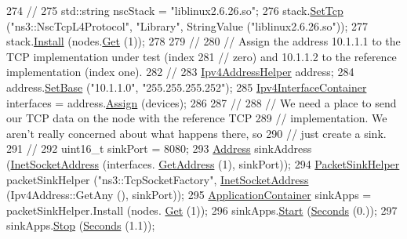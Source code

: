 \begin{DoxyCode}
274   \textcolor{comment}{//}
275   std::string nscStack = \textcolor{stringliteral}{"liblinux2.6.26.so"};
276   stack.\hyperlink{classns3_1_1InternetStackHelper_ac76e9cf493ef559f311c4ef85945129f}{SetTcp} (\textcolor{stringliteral}{"ns3::NscTcpL4Protocol"}, \textcolor{stringliteral}{"Library"}, StringValue (\textcolor{stringliteral}{"liblinux2.6.26.so"}));
277   stack.\hyperlink{classns3_1_1InternetStackHelper_a6645b412f31283d2d9bc3d8a95cebbc0}{Install} (nodes.\hyperlink{classns3_1_1NodeContainer_a9ed96e2ecc22e0f5a3d4842eb9bf90bf}{Get} (1));
278 
279   \textcolor{comment}{//}
280   \textcolor{comment}{// Assign the address 10.1.1.1 to the TCP implementation under test (index}
281   \textcolor{comment}{// zero) and 10.1.1.2 to the reference implementation (index one).}
282   \textcolor{comment}{//}
283   \hyperlink{classns3_1_1Ipv4AddressHelper}{Ipv4AddressHelper} address;
284   address.\hyperlink{classns3_1_1Ipv4AddressHelper_acf7b16dd25bac67e00f5e25f90a9a035}{SetBase} (\textcolor{stringliteral}{"10.1.1.0"}, \textcolor{stringliteral}{"255.255.255.252"});
285   \hyperlink{classns3_1_1Ipv4InterfaceContainer}{Ipv4InterfaceContainer} interfaces = address.\hyperlink{classns3_1_1Ipv4AddressHelper_af8e7f4a1a7e74c00014a1eac445a27af}{Assign} (devices);
286 
287   \textcolor{comment}{//}
288   \textcolor{comment}{// We need a place to send our TCP data on the node with the reference TCP }
289   \textcolor{comment}{// implementation.  We aren't really concerned about what happens there, so}
290   \textcolor{comment}{// just create a sink.}
291   \textcolor{comment}{//}
292   uint16\_t sinkPort = 8080;
293   \hyperlink{classns3_1_1Address}{Address} sinkAddress (\hyperlink{classns3_1_1InetSocketAddress}{InetSocketAddress} (interfaces.
      \hyperlink{classns3_1_1Ipv4InterfaceContainer_ae63208dcd222be986822937ee4aa828c}{GetAddress} (1), sinkPort));
294   \hyperlink{classns3_1_1PacketSinkHelper}{PacketSinkHelper} packetSinkHelper (\textcolor{stringliteral}{"ns3::TcpSocketFactory"}, 
      \hyperlink{classns3_1_1InetSocketAddress}{InetSocketAddress} (Ipv4Address::GetAny (), sinkPort));
295   \hyperlink{classns3_1_1ApplicationContainer}{ApplicationContainer} sinkApps = packetSinkHelper.Install (nodes.
      \hyperlink{classns3_1_1NodeContainer_a9ed96e2ecc22e0f5a3d4842eb9bf90bf}{Get} (1));
296   sinkApps.\hyperlink{classns3_1_1ApplicationContainer_a8eff87926507020bbe3e1390358a54a7}{Start} (\hyperlink{group__timecivil_ga33c34b816f8ff6628e33d5c8e9713b9e}{Seconds} (0.));
297   sinkApps.\hyperlink{classns3_1_1ApplicationContainer_adfc52f9aa4020c8714679b00bbb9ddb3}{Stop} (\hyperlink{group__timecivil_ga33c34b816f8ff6628e33d5c8e9713b9e}{Seconds} (1.1));

\end{DoxyCode}

